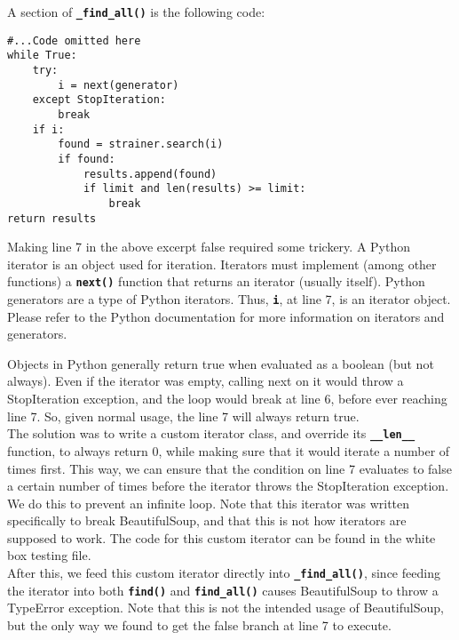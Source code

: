 \documentclass[10pt]{article}
\newcommand{\tbt}[1]{\texttt{\textbf{#1}}}
\begin{document}
\noindent\begin{minipage}{\textwidth}
\indent{\hspace{12pt}} A section of \tbt{\_find\_all()} is the following code:
\begin{lstlisting}[style = pythonstyle-with-numbers]
#...Code omitted here
while True:
    try:
        i = next(generator)
    except StopIteration:
        break
    if i:
        found = strainer.search(i)
        if found:
            results.append(found)
            if limit and len(results) >= limit:
                break
return results
\end{lstlisting}
\end{minipage}

Making line 7 in the above excerpt false required some trickery. A Python iterator is an object used for iteration. Iterators must implement (among other functions) a \tbt{next()} function that returns an iterator (usually itself). Python generators are a type of Python iterators. Thus, \tbt{i}, at line 7, is an iterator object. Please refer to the Python documentation for more information on iterators and generators. 

Objects in Python generally return true when evaluated as a boolean (but not always). Even if the iterator was empty, calling next on it would throw a StopIteration exception, and the loop would break at line 6, before ever reaching line 7. So, given normal usage, the line 7 will always return true. \\

The solution was to write a custom iterator class, and override its \tbt{\_\_len\_\_} function, to always return 0, while making sure that it would iterate a number of times first. This way, we can ensure that the condition on line 7 evaluates to false a certain number of times before the iterator throws the StopIteration exception. We do this to prevent an infinite loop. Note that this iterator was written specifically to break BeautifulSoup, and that this is not how iterators are supposed to work. The code for this custom iterator can be found in the white box testing file. \\

After this, we feed this custom iterator directly into \tbt{\_find\_all()}, since feeding the iterator into both \tbt{find()} and \tbt{find\_all()} causes BeautifulSoup to throw a TypeError exception. Note that this is not the intended usage of BeautifulSoup, but the only way we found to get the false branch at line 7 to execute. \\
\end{document}

